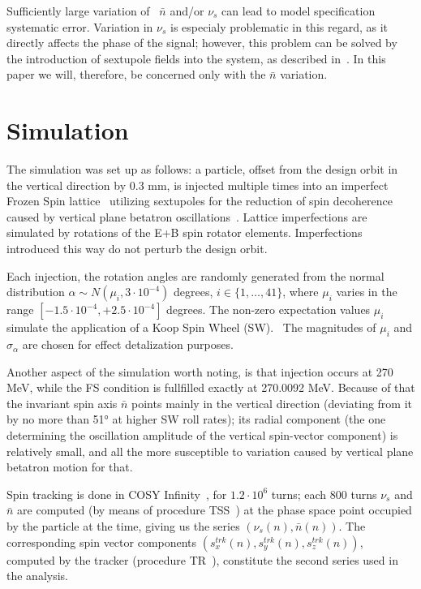 \documentclass[a4paper]{jacow}
\newcommand{\nbar}{\bar n}
\begin{document}
Sufficiently large variation of~ $\nbar$ and/or $\nu_s$ can lead to model specification systematic error.
Variation in $\nu_s$ is especialy problematic in this regard, as it directly affects the phase of the signal;
however, this problem can be solved by the introduction of sextupole fields into the system,
as described in~\cite{Aksentev:IPAC19:Decoh}. In this paper we will, therefore, be concerned only with the $\nbar$
variation.

\section{Simulation}
The simulation was set up as follows: a particle, offset from the design orbit in the vertical
direction by 0.3 mm, is injected multiple times into an imperfect
Frozen Spin lattice~\cite{Senichev:ICAP15-MODBC4} utilizing sextupoles for
the reduction of spin decoherence caused by vertical plane betatron
oscillations~\cite{Aksentev:IPAC19:Decoh}. Lattice imperfections are simulated by rotations of the E+B spin
rotator elements. Imperfections introduced this way do not perturb the design orbit.

Each injection, the rotation angles are randomly generated from the
normal distribution $\alpha\sim N(\mu_i, 3\cdot 10^{-4})$ degrees, $i\in\{1,\dots,41\}$, where
$\mu_i$ varies in the range $[-1.5\cdot10^{-4}, +2.5\cdot10^{-4}]$ degrees. The non-zero expectation values $\mu_i$
simulate the application of a Koop Spin Wheel (SW).~\cite{Koop:IPAC13-TUPWO040} The magnitudes of
$\mu_i$ and $\sigma_{\alpha}$ are chosen for effect detalization purposes.

Another aspect of the simulation worth noting, is that injection occurs at 270 MeV, while the FS condition
is fullfilled exactly at 270.0092 MeV. Because of that the invariant spin axis $\nbar$
points mainly in the vertical direction (deviating from it by no more than \ang{51} at higher SW roll rates);
its radial component (the one determining the oscillation amplitude of the vertical spin-vector component)
is relatively small, and all the more susceptible to variation caused by vertical plane betatron motion for that. 

Spin tracking is done in COSY Infinity~\cite{COSYINF:Website}, for $1.2\cdot10^6$ turns; each 800 turns
$\nu_s$ and $\nbar$ are computed (by means of procedure TSS~\cite[p.~41]{COSYINF:BeamPhysMan}) at
the phase space point occupied by the particle at the time, giving us the series $(\nu_s(n), \nbar(n))$.
The corresponding spin vector components $(s_x^{trk}(n), s_y^{trk}(n), s_z^{trk}(n))$,
computed by the tracker (procedure
TR~\cite[p.~41]{COSYINF:BeamPhysMan}), 
constitute the second series used in the analysis.
\end{document}
